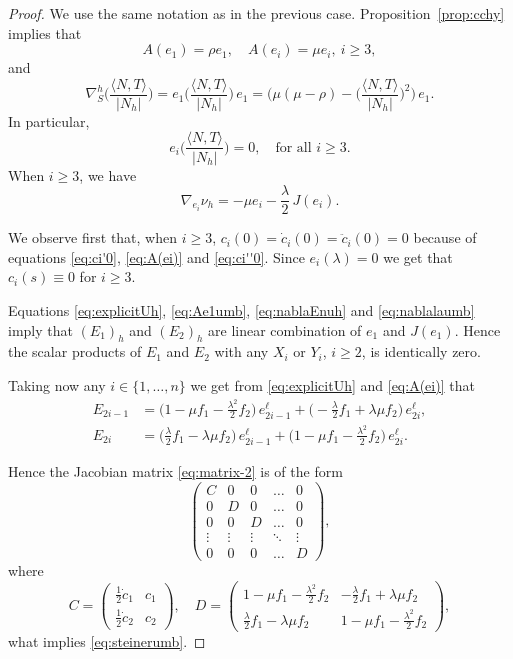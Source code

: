 \documentclass[10pt]{amsart}
\theoremstyle{definition}
\theoremstyle{remark}
\numberwithin{equation}{section}
\begin{document}
\begin{proof}
We use the same notation as in the previous case. Proposition~\ref{prop:cchy} implies that
\begin{equation}
\label{eq:Ae1umb}
A(e_1)=\rho e_1, \quad A(e_i)=\mu e_i,\ i{\geqslant} 3,
\end{equation}
and
\begin{equation}
\label{eq:nablalaumb}
\nabla_S^h\bigg({\frac{{\langle{N,T}\rangle}}{|N_h|}}\bigg)=e_1\bigg({\frac{{\langle{N,T}\rangle}}{|N_h|}}\bigg)\,e_1=\bigg(\mu(\mu-\rho)-\bigg({\frac{{\langle{N,T}\rangle}}{|N_h|}}\bigg)^2\bigg)\,e_1.
\end{equation}
In particular,
\[
e_i\bigg({\frac{{\langle{N,T}\rangle}}{|N_h|}}\bigg)=0,\quad\text{for all } i{\geqslant} 3.
\]
When $i{\geqslant} 3$, we have
\begin{equation}
\label{eq:A(ei)}
\nabla_{e_i}{\nu_{h}}=-\mu e_i-\frac{\lambda}{2}\,J(e_i).
\end{equation}

We observe first that, when $i{\geqslant} 3$, $c_i(0)=\dot{c}_i(0)=\ddot{c}_i(0)=0$ because of equations \eqref{eq:ci'0}, \eqref{eq:A(ei)} and \eqref{eq:ci''0}. Since $e_i({\lambda})=0$ we get that $c_i(s)\equiv 0$ for $i{\geqslant} 3$.

Equations \eqref{eq:explicitUh}, \eqref{eq:Ae1umb}, \eqref{eq:nablaEnuh} and \eqref{eq:nablalaumb} imply that $(E_1)_h$ and $(E_2)_h$ are linear combination of $e_1$ and $J(e_1)$. Hence the scalar products of $E_1$ and $E_2$ with any $X_i$ or $Y_i$, $i{\geqslant} 2$, is identically zero.

Taking now any $i\in\{1,\ldots,n\}$ we get from \eqref{eq:explicitUh} and \eqref{eq:A(ei)} that
\begin{align*}
E_{2i-1}&=\big(1-\mu f_1-\tfrac{{\lambda}^2}{2}f_2\big)\,e_{2i-1}^\ell+\big(-\tfrac{\lambda}{2}f_1+{\lambda}\mu f_2\big)\,e_{2i}^\ell,
\\
E_{2i}&=\big(\tfrac{\lambda}{2}f_1-{\lambda}\mu f_2\big)\,e_{2i-1}^\ell+\big(1-\mu f_1-\tfrac{{\lambda}^2}{2}f_2\big)\,e_{2i}^\ell.
\end{align*}

Hence the Jacobian matrix \eqref{eq:matrix-2} is of the form
\[
\begin{pmatrix}
C & 0 & 0 & \dots & 0 \\
0 & D & 0 & \ldots & 0 \\
0 & 0 & D & \ldots & 0 \\
\vdots & \vdots & \vdots & \ddots & \vdots \\
0 & 0 & 0 & \ldots & D
\end{pmatrix},
\]
where
\[
C=\begin{pmatrix} \tfrac{1}{2}\dot{c}_1 & c_1 \\
\tfrac{1}{2}\dot{c}_2 & c_2 
\end{pmatrix},\quad 
D=\begin{pmatrix}
1-\mu f_1-\tfrac{{\lambda}^2}{2}f_2 & -\tfrac{\lambda}{2}f_1+{\lambda}\mu f_2 \\
\tfrac{\lambda}{2}f_1-{\lambda}\mu f_2 & 1-\mu f_1-\tfrac{{\lambda}^2}{2} f_2
\end{pmatrix},
\]
what implies \eqref{eq:steinerumb}.
\end{proof}


\end{document}
